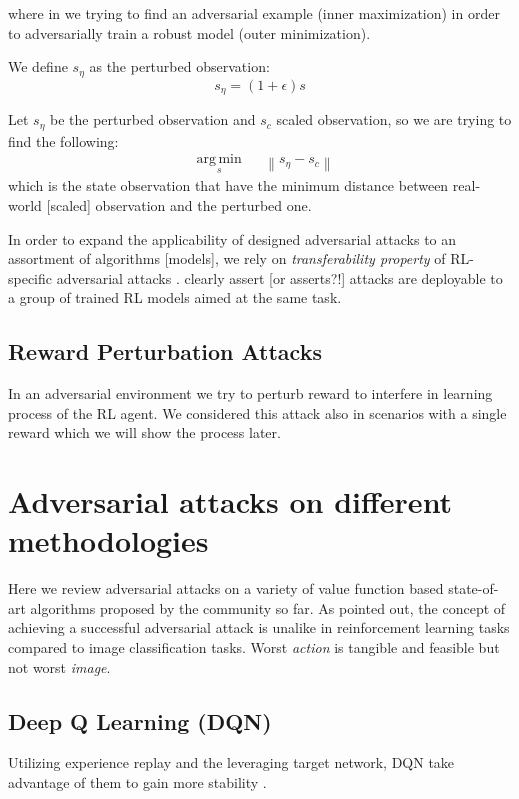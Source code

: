 \documentclass[letterpaper,12pt]{article}
\DeclareMathOperator*{\argmin}{arg\,min}
\newcommand{\norm}[1]{\left\lVert#1\right\rVert}
\begin{document}
where in we trying to find an adversarial example (inner maximization) in order to adversarially train a robust model (outer minimization).

We define $s_\eta$ as the perturbed observation:
\begin{equation}
    s_\eta = (1 + \epsilon) s
\end{equation}


Let $s_\eta$ be the perturbed observation and $s_c$ scaled observation, so we are trying to find the following:
\begin{equation}
\begin{aligned}
& \underset{s}{\argmin}
& & {\norm{s_\eta - s_c}}
\end{aligned}
\end{equation}
which is the state observation that have the minimum distance between real-world [scaled] observation and the perturbed one.

In order to expand the applicability of designed adversarial attacks to an assortment of algorithms [models], we rely on \textit{transferability property} of RL-specific adversarial attacks \cite{Szegedy2014, Papernot2016, Goodfellow2014a}. \citet{Huang2017} clearly assert [or asserts?!] attacks are deployable to a group of trained RL models aimed at the same task.  

\subsection{Reward Perturbation Attacks}
In an adversarial environment we try to perturb reward to interfere in learning process of the RL agent. We considered this attack also in scenarios with a single reward which we will show the process later.

\section{Adversarial attacks on different methodologies}
Here we review adversarial attacks on a variety of value function based state-of-art algorithms proposed by the community so far. As \citet{Pattanaik2018} pointed out, the concept of achieving a successful adversarial attack is unalike in reinforcement learning tasks compared to image classification tasks. Worst \textit{action} is tangible and feasible but not worst \textit{image}.

\subsection{Deep Q Learning (DQN)}
Utilizing experience replay and the leveraging target network, DQN take advantage of them to gain more stability \cite{Pattanaik2018}.
\end{document}
